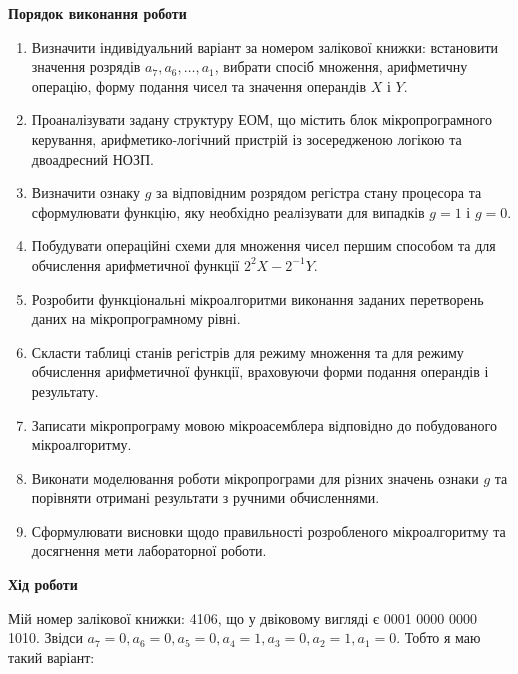 \documentclass[12pt,a4paper]{article}
\begin{document}
    \begin{center} \textbf{\large Порядок виконання роботи} \end{center}

    \begin{enumerate}
        \item Визначити індивідуальний варіант за номером залікової книжки: встановити значення розрядів $a_7, a_6, \ldots, a_1$, вибрати спосіб множення, арифметичну операцію, форму подання чисел та значення операндів $X$ і $Y$.
        \item Проаналізувати задану структуру ЕОМ, що містить блок мікропрограмного керування, арифметико-логічний пристрій із зосередженою логікою та двоадресний НОЗП.
        \item Визначити ознаку $g$ за відповідним розрядом регістра стану процесора та сформулювати функцію, яку необхідно реалізувати для випадків $g = 1$ і $g = 0$.
        \item Побудувати операційні схеми для множення чисел першим способом та для обчислення арифметичної функції $2^{2}X - 2^{-1}Y$.
        \item Розробити функціональні мікроалгоритми виконання заданих перетворень даних на мікропрограмному рівні.
        \item Скласти таблиці станів регістрів для режиму множення та для режиму обчислення арифметичної функції, враховуючи форми подання операндів і результату.
        \item Записати мікропрограму мовою мікроасемблера відповідно до побудованого мікроалгоритму.
        \item Виконати моделювання роботи мікропрограми для різних значень ознаки $g$ та порівняти отримані результати з ручними обчисленнями.
        \item Сформулювати висновки щодо правильності розробленого мікроалгоритму та досягнення мети лабораторної роботи.
    \end{enumerate}

    \newpage

    \begin{center} \textbf{\large Хід роботи} \end{center}

    Мій номер залікової книжки: 4106, що у двіковому вигляді є 0001 0000 0000 1010.
    Звідси $a_7 = 0, a_6 = 0, a_5 = 0, a_4 = 1, a_3 = 0, a_2 = 1, a_1 = 0$. Тобто я маю такий варіант:
\end{document}
